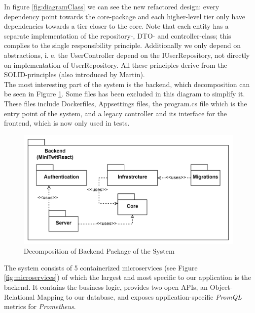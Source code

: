 In figure \ref{fig:diagramClass} we can see the new refactored design: every dependency point towards the core-package and each higher-level tier only have dependencies towards a tier closer to the core.  Note that each entity has a separate implementation of the repository-, DTO- and controller-class; this complies to the single responsibility principle. Additionally we only depend on abstractions, i. e. the UserController depend on the IUserRepository, not directly on implementation of UserRepository. All these principles derive from the SOLID-principles (also introduced by Martin).\\


The most interesting part of the system is the backend, which decomposition can be seen in Figure \ref{fig:decompositionBackend}.
Some files has been excluded in this diagram to simplify it. 
These files include Dockerfiles, Appsettings files, the program.cs file which is the entry point of the system, and a legacy controller and its interface for the frontend, which is now only used in tests. 

\begin{figure}[H]
    \centering
    \includegraphics[scale=0.18]{images/package_class-diagrams/decomposition_backend.png}
    \caption{Decomposition of Backend Package of the \mini System}
    \label{fig:decompositionBackend}
\end{figure}


The system consists of 5 containerized microservices (see Figure \ref{fig:microservices}) of which the largest and most specific to our application is the \cs backend.
It contains the business logic, provides two open APIs, an Object-Relational Mapping to our database, and exposes application-specific \textit{PromQL} metrics for \textit{Prometheus}. \par

